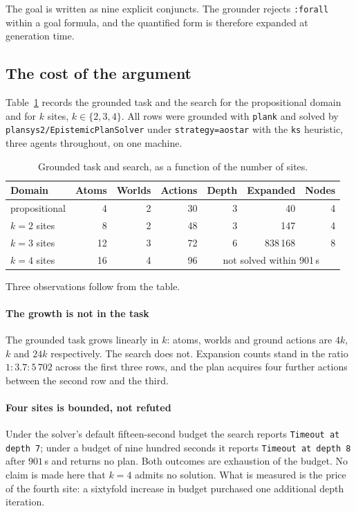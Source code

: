 \documentclass[11pt,a4paper]{article}
\theoremstyle{definition}
\newcommand{\code}[1]{\texttt{\small #1}}
\begin{document}
The goal is written as nine explicit conjuncts. The grounder rejects
\code{:forall} within a goal formula, and the quantified form is therefore
expanded at generation time.

\subsection{The cost of the argument}

Table~\ref{tab:scaling} records the grounded task and the search for the
propositional domain and for $k$ sites, $k \in \{2,3,4\}$. All rows were
grounded with \code{plank} and solved by \code{plansys2/Epistemic\-Plan\-Solver}
under \code{strategy=aostar} with the \code{ks} heuristic, three agents
throughout, on one machine.

\begin{table}[H]
\centering\small
\caption{Grounded task and search, as a function of the number of sites.}
\label{tab:scaling}
\begin{tabular}{@{}lrrrrrr@{}}
\toprule
\textbf{Domain} & \textbf{Atoms} & \textbf{Worlds} & \textbf{Actions}
  & \textbf{Depth} & \textbf{Expanded} & \textbf{Nodes} \\
\midrule
propositional      &  4 & 2 & 30 & 3 & 40      & 4 \\
$k = 2$ sites      &  8 & 2 & 48 & 3 & 147     & 4 \\
$k = 3$ sites      & 12 & 3 & 72 & 6 & 838\,168 & 8 \\
$k = 4$ sites      & 16 & 4 & 96 & \multicolumn{3}{c}{not solved within 901\,s} \\
\bottomrule
\end{tabular}
\end{table}

Three observations follow from the table.

\paragraph{The growth is not in the task} The grounded task grows linearly in
$k$: atoms, worlds and ground actions are $4k$, $k$ and $24k$ respectively. The
search does not. Expansion counts stand in the ratio $1 : 3.7 : 5\,702$ across
the first three rows, and the plan acquires four further actions between the
second row and the third.

\paragraph{Four sites is bounded, not refuted} Under the solver's default
fifteen-second budget the search reports \code{Timeout at depth 7}; under a
budget of nine hundred seconds it reports \code{Timeout at depth 8} after
$901$\,s and returns no plan. Both outcomes are exhaustion of the budget. No
claim is made here that $k = 4$ admits no solution. What is measured is the
price of the fourth site: a sixtyfold increase in budget purchased one
additional depth iteration.
\end{document}
